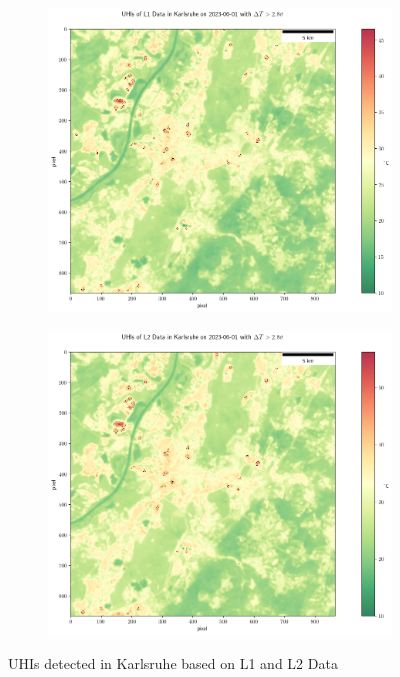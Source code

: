 \documentclass[a4paper, english]{article}
\begin{document}
\begin{figure}[!p]
    \centering
    \begin{subfigure}{0.49\textwidth}
    \includegraphics[width=\textwidth]{img/UHIL1Karlsruhe.png}
    \end{subfigure}
    \begin{subfigure}{0.49\textwidth}
    \includegraphics[width=\textwidth]{img/UHIL2Karlsruhe.png}
    \end{subfigure}
    \caption{UHIs detected in Karlsruhe\label{fig:UHIsKarlsruhe} based on L1 and L2 Data}
\end{figure}
\end{document}
